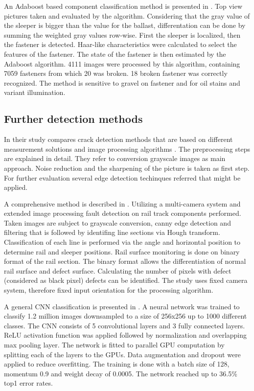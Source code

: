 \documentclass[10pt, final]{article}
\begin{document}
An Adaboost based component classification method is presented in \cite{xia_broken_2010}.
Top view pictures taken and evaluated by the algorithm.
Considering that the gray value of the sleeper is bigger than the value for the ballast, differentation can be done
by summing the weighted gray values row-wise.
First the sleeper is localized, then the fastener is detected.
Haar-like characteristics were calculated to select the features of the fastener.
The state of the fastener is then estimated by the Adaboost algorithm.
4111 images were processed by this algorithm, containing 7059 fasteners from which 20 was broken.
18 broken fastener was correctly recognized.
The method is sensitive to gravel on fastener and for oil stains and variant illumination.

\subsection{Further detection methods}
In their study \citeauthor{kumar_m_survey_2018} compares crack detection methods that are based on different
measurement solutions and image processing algorithms \cite{kumar_m_survey_2018}.
The preprocessing steps are explained in detail.
They refer to conversion grayscale images as main approach.
Noise reduction and the sharpening of the picture is taken as first step.
For further evaluation several edge detection techinques referred that might be applied.

A comprehensive method is described in \cite{karakose_new_2018}.
Utilizing a multi-camera system and extended image processing fault detection on rail track components performed.
Taken images are subject to grayscale conversion, canny edge detection and filtering that is followed by
identifing line sections via Hough transform.
Classification of each line is performed via the angle and horizontal position to determine rail and sleeper positions.
Rail surface monitoring is done on binary format of the rail section.
The binary format allows the differentiation of normal rail surface and defect surface.
Calculating the number of pixels with defect (considered as black pixel) defects can be identified.
The study uses fixed camera system, therefore fixed input orientation for the processing algorithm.

A general CNN classification is presented in \cite{krizhevsky_imagenet_2017}.
A neural network was trained to classify 1.2 million images downsampled to a size of 256x256 up to 1000 different classes.
The CNN consists of 5 convolutional layers and 3 fully connected layers.
ReLU activation function was applied followed by normalization and overlapping max pooling layer.
The network is fitted to parallel GPU computation by splitting each of the layers to the GPUs.
Data augmentation and dropout were applied to reduce overfitting.
The training is done with a batch size of 128, momentum 0.9 and weight decay of 0.0005.
The network reached up to 36.5\% top1 error rates.
\end{document}
